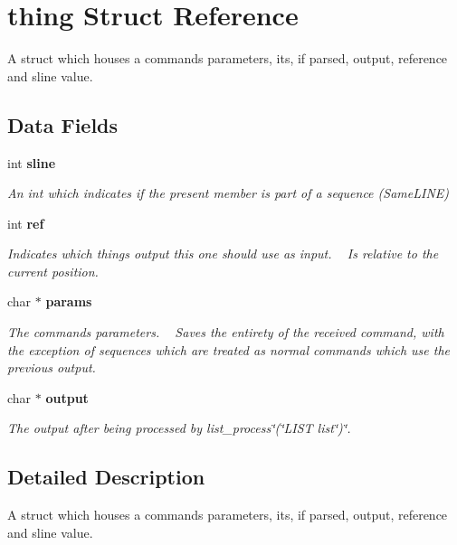\section{thing Struct Reference}
\label{structthing}


A struct which houses a command\textquotesingle{}s parameters, it\textquotesingle{}s, if parsed, output, reference and sline value.  


\subsection*{Data Fields}
\begin{DoxyCompactItemize}
\item 
int {\bf sline}
\begin{DoxyCompactList}\small\item\em An int which indicates if the present member is part of a sequence (Same\+L\+I\+NE) \end{DoxyCompactList}\item 
int {\bf ref}
\begin{DoxyCompactList}\small\item\em Indicates which thing\textquotesingle{}s output this one should use as input.  ~\newline
 Is relative to the current position. \end{DoxyCompactList}\item 
char $\ast$ {\bf params}
\begin{DoxyCompactList}\small\item\em The command\textquotesingle{}s parameters.  ~\newline
 Saves the entirety of the received command, with the exception of sequences which are treated as normal commands which use the previous\textquotesingle{} output. \end{DoxyCompactList}\item 
char $\ast$ {\bf output}
\begin{DoxyCompactList}\small\item\em The output after being processed by list\+\_\+process\char`\"{}(\char`\"{}L\+I\+ST list\char`\"{})\char`\"{}. \end{DoxyCompactList}\end{DoxyCompactItemize}


\subsection{Detailed Description}
A struct which houses a command\textquotesingle{}s parameters, it\textquotesingle{}s, if parsed, output, reference and sline value. 

